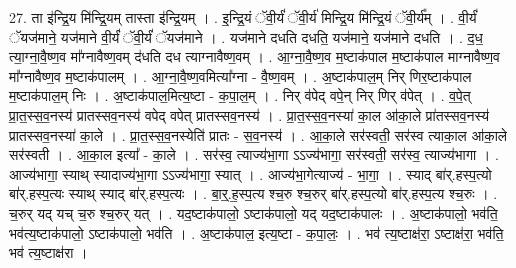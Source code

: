 \documentclass[17pt]{extarticle}
\begin{document}
27. ता इ॑न्द्रि॒य मि॑न्द्रि॒यम् तास्ता इ॑न्द्रि॒यम् । . इ॒न्द्रि॒यं ॅवी॒र्यं॑ ॅवी॒र्य॑ मिन्द्रि॒य मि॑न्द्रि॒यं ॅवी॒र्य᳚म् । . वी॒र्यं॑ ॅयज॑माने॒ यज॑माने वी॒र्यं॑ ॅवी॒र्यं॑ ॅयज॑माने । . यज॑माने दधति दधति॒ यज॑माने॒ यज॑माने दधति । . द॒ध॒ त्या॒ग्ना॒वै॒ष्ण॒व मा᳚ग्नावैष्ण॒वम् द॑धति दध त्याग्नावैष्ण॒वम् । . आ॒ग्ना॒वै॒ष्ण॒व म॒ष्टाक॑पाल म॒ष्टाक॑पाल माग्नावैष्ण॒व मा᳚ग्नावैष्ण॒व म॒ष्टाक॑पालम् । . आ॒ग्ना॒वै॒ष्ण॒वमित्या᳚ग्ना - वै॒ष्ण॒वम् । . अ॒ष्टाक॑पाल॒म् निर् णिर॒ष्टाक॑पाल म॒ष्टाक॑पाल॒म् निः । . अ॒ष्टाक॑पाल॒मित्य॒ष्टा - क॒पा॒ल॒म् । . निर् व॑पेद् वपे॒न् निर् णिर् व॑पेत् । . व॒पे॒त् प्रा॒त॒स्स॒व॒नस्य॑ प्रातस्सव॒नस्य॑ वपेद् वपेत् प्रातस्सव॒नस्य॑ । . प्रा॒त॒स्स॒व॒नस्या॑ का॒ल आ॑का॒ले प्रा॑तस्सव॒नस्य॑ प्रातस्सव॒नस्या॑ का॒ले । . प्रा॒त॒स्स॒व॒नस्येति॑ प्रातः - स॒व॒नस्य॑ । . आ॒का॒ले सर॑स्वती॒ सर॑स्व त्याका॒ल आ॑का॒ले सर॑स्वती । . आ॒का॒ल इत्या᳚ - का॒ले । . सर॑स्व॒ त्याज्य॑भा॒गा ऽऽज्य॑भागा॒ सर॑स्वती॒ सर॑स्व॒ त्याज्य॑भागा । . आज्य॑भागा॒ स्याथ् स्यादाज्य॑भा॒गा ऽऽज्य॑भागा॒ स्यात् । . आज्य॑भा॒गेत्याज्य॑ - भा॒गा॒ । . स्याद् बा॑र्.हस्प॒त्यो बा॑र्.हस्प॒त्यः स्याथ् स्याद् बा॑र्.हस्प॒त्यः । . बा॒र्॒.ह॒स्प॒त्य श्च॒रु श्च॒रुर् बा॑र्.हस्प॒त्यो बा॑र्.हस्प॒त्य श्च॒रुः । . च॒रुर् यद् यच् च॒रु श्च॒रुर् यत् । . यद॒ष्टाक॑पालो॒ ऽष्टाक॑पालो॒ यद् यद॒ष्टाक॑पालः । . अ॒ष्टाक॑पालो॒ भव॑ति॒ भव॑त्य॒ष्टाक॑पालो॒ ऽष्टाक॑पालो॒ भव॑ति । . अ॒ष्टाक॑पाल॒ इत्य॒ष्टा - क॒पा॒लः॒ । . भव॑ त्य॒ष्टाक्ष॑रा॒ ऽष्टाक्ष॑रा॒ भव॑ति॒ भव॑ त्य॒ष्टाक्ष॑रा । \newline
\end{document}

